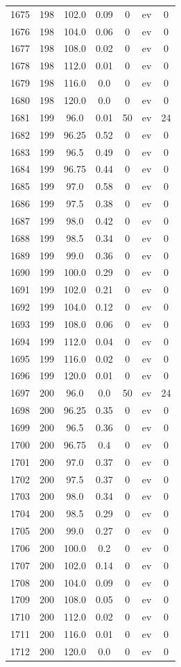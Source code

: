 \documentclass[12pt,a4paper]{article}
\begin{document}
\begin{tabular}{r|cccccc}
	1675 & 198 & 102.0 & 0.09 & 0 & ev & 0 \\
	1676 & 198 & 104.0 & 0.06 & 0 & ev & 0 \\
	1677 & 198 & 108.0 & 0.02 & 0 & ev & 0 \\
	1678 & 198 & 112.0 & 0.01 & 0 & ev & 0 \\
	1679 & 198 & 116.0 & 0.0 & 0 & ev & 0 \\
	1680 & 198 & 120.0 & 0.0 & 0 & ev & 0 \\
	1681 & 199 & 96.0 & 0.01 & 50 & ev & 24 \\
	1682 & 199 & 96.25 & 0.52 & 0 & ev & 0 \\
	1683 & 199 & 96.5 & 0.49 & 0 & ev & 0 \\
	1684 & 199 & 96.75 & 0.44 & 0 & ev & 0 \\
	1685 & 199 & 97.0 & 0.58 & 0 & ev & 0 \\
	1686 & 199 & 97.5 & 0.38 & 0 & ev & 0 \\
	1687 & 199 & 98.0 & 0.42 & 0 & ev & 0 \\
	1688 & 199 & 98.5 & 0.34 & 0 & ev & 0 \\
	1689 & 199 & 99.0 & 0.36 & 0 & ev & 0 \\
	1690 & 199 & 100.0 & 0.29 & 0 & ev & 0 \\
	1691 & 199 & 102.0 & 0.21 & 0 & ev & 0 \\
	1692 & 199 & 104.0 & 0.12 & 0 & ev & 0 \\
	1693 & 199 & 108.0 & 0.06 & 0 & ev & 0 \\
	1694 & 199 & 112.0 & 0.04 & 0 & ev & 0 \\
	1695 & 199 & 116.0 & 0.02 & 0 & ev & 0 \\
	1696 & 199 & 120.0 & 0.01 & 0 & ev & 0 \\
	1697 & 200 & 96.0 & 0.0 & 50 & ev & 24 \\
	1698 & 200 & 96.25 & 0.35 & 0 & ev & 0 \\
	1699 & 200 & 96.5 & 0.36 & 0 & ev & 0 \\
	1700 & 200 & 96.75 & 0.4 & 0 & ev & 0 \\
	1701 & 200 & 97.0 & 0.37 & 0 & ev & 0 \\
	1702 & 200 & 97.5 & 0.37 & 0 & ev & 0 \\
	1703 & 200 & 98.0 & 0.34 & 0 & ev & 0 \\
	1704 & 200 & 98.5 & 0.29 & 0 & ev & 0 \\
	1705 & 200 & 99.0 & 0.27 & 0 & ev & 0 \\
	1706 & 200 & 100.0 & 0.2 & 0 & ev & 0 \\
	1707 & 200 & 102.0 & 0.14 & 0 & ev & 0 \\
	1708 & 200 & 104.0 & 0.09 & 0 & ev & 0 \\
	1709 & 200 & 108.0 & 0.05 & 0 & ev & 0 \\
	1710 & 200 & 112.0 & 0.02 & 0 & ev & 0 \\
	1711 & 200 & 116.0 & 0.01 & 0 & ev & 0 \\
	1712 & 200 & 120.0 & 0.0 & 0 & ev & 0 \\
\end{tabular}
\end{document}
